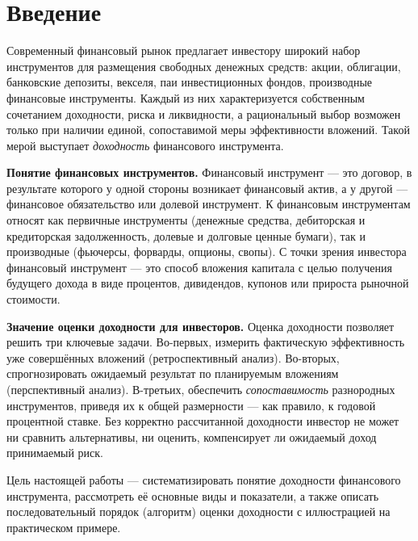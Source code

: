 \documentclass[14pt, a4paper]{extarticle}
\begin{document}
\renewcommand{\contentsname}{Содержание}
\begingroup
\normalsize
\tableofcontents
\endgroup
\newpage

\section*{Введение}
\setcounter{section}{0}

Современный финансовый рынок предлагает инвестору широкий набор инструментов
для размещения свободных денежных средств: акции, облигации, банковские
депозиты, векселя, паи инвестиционных фондов, производные финансовые
инструменты. Каждый из них характеризуется собственным сочетанием доходности,
риска и ликвидности, а рациональный выбор возможен только при наличии единой,
сопоставимой меры эффективности вложений. Такой мерой выступает
\emph{доходность} финансового инструмента.

\textbf{Понятие финансовых инструментов.} Финансовый инструмент — это
договор, в результате которого у одной стороны возникает финансовый актив, а у
другой — финансовое обязательство или долевой инструмент. К финансовым
инструментам относят как первичные инструменты (денежные средства,
дебиторская и кредиторская задолженность, долевые и долговые ценные бумаги),
так и производные (фьючерсы, форварды, опционы, свопы). С точки зрения
инвестора финансовый инструмент — это способ вложения капитала с целью
получения будущего дохода в виде процентов, дивидендов, купонов или прироста
рыночной стоимости.

\textbf{Значение оценки доходности для инвесторов.} Оценка доходности
позволяет решить три ключевые задачи. Во-первых, измерить фактическую
эффективность уже совершённых вложений (ретроспективный анализ). Во-вторых,
спрогнозировать ожидаемый результат по планируемым вложениям (перспективный
анализ). В-третьих, обеспечить \emph{сопоставимость} разнородных инструментов,
приведя их к общей размерности — как правило, к годовой процентной ставке.
Без корректно рассчитанной доходности инвестор не может ни сравнить
альтернативы, ни оценить, компенсирует ли ожидаемый доход принимаемый риск.

Цель настоящей работы — систематизировать понятие доходности финансового
инструмента, рассмотреть её основные виды и показатели, а также описать
последовательный порядок (алгоритм) оценки доходности с иллюстрацией на
практическом примере.

\end{document}

